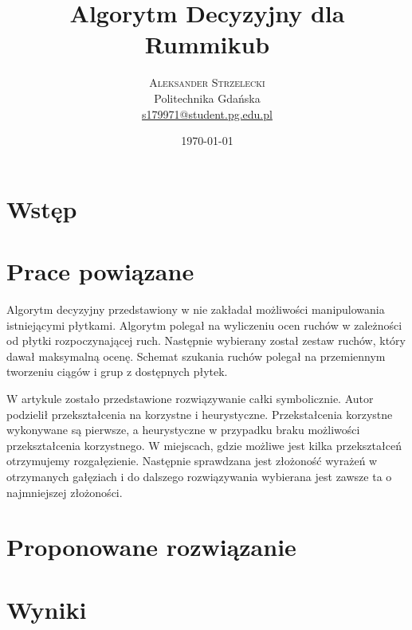 \documentclass[twoside,twocolumn]{article}
\title{Algorytm Decyzyjny dla Rummikub} %
\author{%
\textsc{Aleksander Strzelecki}\\[1ex] %
\normalsize Politechnika Gdańska \\ %
\normalsize \href{mailto:s179971@student.pg.edu.pl}{s179971@student.pg.edu.pl} %
}
\date{\today} %
\begin{document}
\maketitle


\section{Wstęp}




\section{Prace powiązane}

Algorytm decyzyjny przedstawiony w \cite{Rijn:2016fr} nie zakładał możliwości 
manipulowania istniejącymi płytkami. Algorytm polegał na wyliczeniu ocen ruchów w zależności od 
płytki rozpoczynającej ruch. Następnie wybierany został zestaw ruchów, który dawał maksymalną 
ocenę. Schemat szukania ruchów polegał na przemiennym tworzeniu ciągów i grup z dostępnych płytek.

W artykule \cite{Slagle:1963js} zostało przedstawione rozwiązywanie całki symbolicznie.
Autor podzielił przekształcenia na korzystne i heurystyczne. Przekstałcenia korzystne wykonywane są pierwsze, a
heurystyczne w przypadku braku możliwości przekształcenia korzystnego. W miejscach, gdzie możliwe jest kilka 
przekształceń otrzymujemy rozgałęzienie. Następnie sprawdzana jest złożoność wyrażeń w otrzymanych gałęziach i 
do dalszego rozwiązywania wybierana jest zawsze ta o najmniejszej złożoności.
\section{Proponowane rozwiązanie}
\section{Wyniki}
\end{document}
